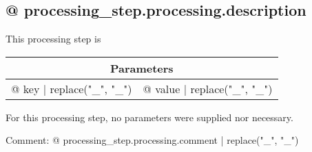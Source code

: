 \subsection{{@ processing_step.processing.description }}

This processing step is %

\vspace*{1ex}
\begin{tabular}{ll}
\toprule
\multicolumn{2}{c}{\textbf{Parameters}}
\\
\midrule
{@ key | replace("_", "\_") } & {@ value | replace("_", "\_") }
\\
\bottomrule
\end{tabular}
\vspace*{1ex}
For this processing step, no parameters were supplied nor necessary.

Comment: {@ processing_step.processing.comment | replace("_", "\_") }
